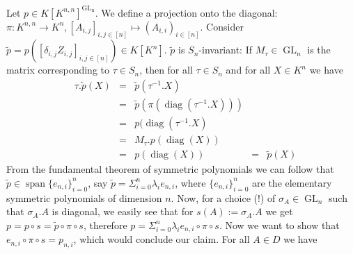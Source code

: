 \begin{example}
  Let $p \in K[K^{n,n}]^{\operatorname{GL_n}}$.
  We define a projection onto the diagonal:
  $\pi \colon K^{n,n} \longrightarrow K^n , [A_{i,j}]_{i,j \in [n]} \longmapsto (A_{i,i})_{i \in [n]} $.
  Consider $\tilde{p} = p \left( [ \delta_{i,j} Z_{i,j}]_{i,j \in [n]} \right) \in K[K^n]$.
  $\tilde{p}$ is $S_n$-invariant:
  If $M_\tau \in \operatorname{GL}_n$ is the matrix corresponding to $\tau \in S_n$, then for all $\tau \in S_n$ and for all $ X \in K^n$ we have
  \begin{equation}
    \begin{aligned}
      &\tau.\tilde{p} (X) &=& \tilde{p} (\tau^{-1}.X)\\
      &&=& \tilde{p} (\pi (\operatorname{diag} (\tau^{-1} . X) ))\\
      &&=& p ( \operatorname{diag}(\tau^{-1}.X)\\
      &&=& M_\tau . p (\operatorname{diag}(X))\\
      &&=& p (\operatorname{diag}(X))&=& \tilde{p} (X)
    \end{aligned}
  \end{equation}
  From the fundamental theorem of symmetric polynomials we can follow that $\tilde{p} \in \operatorname{span}\{e_{n,i}\}_{i=0}^n$, say $\tilde{p} = \Sigma_{i=0}^n \lambda_i e_{n,i}$, where $\{ e_{n,i} \}_{i=0}^n$ are the elementary symmetric polynomials of dimension $n$.
  Now, for a choice (!) of $\sigma_A \in \operatorname{GL}_n$ such that $\sigma_A . A$ is diagonal, we easily see that for $s(A) := \sigma_A . A$ we get $p = p \circ s = \tilde{p} \circ \pi \circ s$, therefore $p = \Sigma_{i=0}^n \lambda_i e_{n,i} \circ \pi \circ s$.
  Now we want to show that $e_{n,i} \circ \pi \circ s = p_{n,i}$, which would conclude our claim.
  For all $A\in D$ we have
  \begin{equation}

\end{equation}
\end{example}
